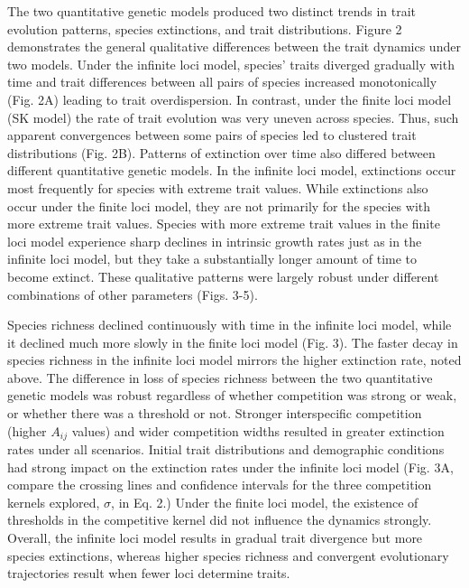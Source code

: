 \documentclass[12pt]{article}
\begin{document}
The two quantitative genetic models produced two distinct trends in trait evolution patterns, species extinctions, and trait distributions. Figure 2 demonstrates the general qualitative differences between the trait dynamics under two models.  Under the infinite loci model, species’ traits diverged gradually with time and trait differences between all pairs of species increased monotonically (Fig. 2A) leading to trait overdispersion. In contrast, under the finite loci model (SK model) the rate of trait evolution was very uneven across species. Thus, such apparent convergences between some pairs of species led to clustered trait distributions (Fig. 2B). Patterns of extinction over time also differed between different quantitative genetic models. In the infinite loci model, extinctions occur most frequently for species with extreme trait values. While extinctions also occur under the finite loci model, they are not primarily for the species with more extreme trait values. Species with more extreme trait values in the finite loci model experience sharp declines in intrinsic growth rates just as in the infinite loci model, but they take a substantially longer amount of time to become extinct. These qualitative patterns were largely robust under different combinations of other parameters (Figs. 3-5). \par

Species richness declined continuously with time in the infinite loci model, while it declined much more slowly in the finite loci model (Fig. 3). The faster decay in species richness in the infinite loci model mirrors the higher extinction rate, noted above. The difference in loss of species richness between the two quantitative genetic models was robust regardless of whether competition was strong or weak, or whether there was a threshold or not. Stronger interspecific competition (higher $A_{ij}$ values) and wider competition widths resulted in greater extinction rates under all scenarios. Initial trait distributions and demographic conditions had strong impact on the extinction rates under the infinite loci model (Fig. 3A, compare the crossing lines and confidence intervals for the three competition kernels explored, $\sigma$, in Eq. 2.) Under the finite loci model, the existence of thresholds in the competitive kernel did not influence the dynamics strongly. Overall, the infinite loci model results in gradual trait divergence but more species extinctions, whereas higher species richness and convergent evolutionary trajectories result when fewer loci determine traits.\par
\end{document}
